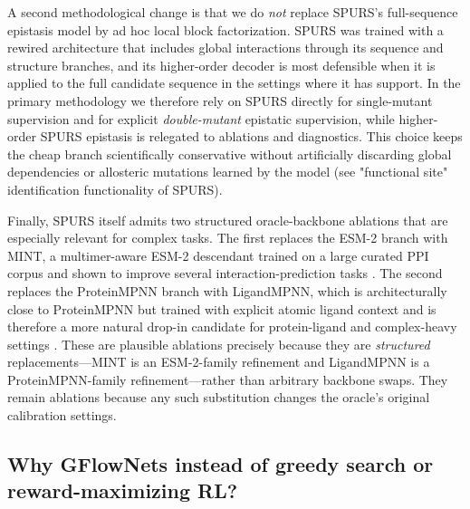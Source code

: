 \documentclass[11pt]{article}
\begin{document}
	A second methodological change is that we do \emph{not} replace SPURS's full-sequence epistasis model by ad hoc local block factorization. SPURS was trained with a rewired architecture that includes global interactions through its sequence and structure branches, and its higher-order decoder is most defensible when it is applied to the full candidate sequence in the settings where it has support. In the primary methodology we therefore rely on SPURS directly for single-mutant supervision and for explicit \emph{double-mutant} epistatic supervision, while higher-order SPURS epistasis is relegated to ablations and diagnostics. This choice keeps the cheap branch scientifically conservative without artificially discarding global dependencies or allosteric mutations learned by the model (see "functional site" identification functionality of SPURS). 
	
	Finally, SPURS itself admits two structured oracle-backbone ablations that are especially relevant for complex tasks. The first replaces the ESM-2 branch with MINT, a multimer-aware ESM-2 descendant trained on a large curated PPI corpus and shown to improve several interaction-prediction tasks \citep{ullanat2025mint}. The second replaces the ProteinMPNN branch with LigandMPNN, which is architecturally close to ProteinMPNN but trained with explicit atomic ligand context and is therefore a more natural drop-in candidate for protein-ligand and complex-heavy settings \citep{dauparas2025ligandmpnn}. These are plausible ablations precisely because they are \emph{structured} replacements---MINT is an ESM-2-family refinement and LigandMPNN is a ProteinMPNN-family refinement---rather than arbitrary backbone swaps. They remain ablations because any such substitution changes the oracle's original calibration settings.
	
	
	\subsection{Why GFlowNets instead of greedy search or reward-maximizing RL?}
	
	
\end{document}
